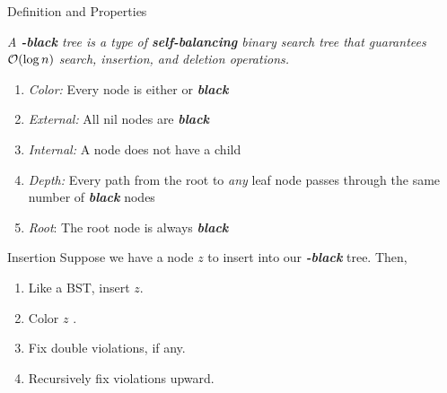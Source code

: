 \documentclass[aspectratio=169]{beamer}
\newcommand{\textib}[1]{\textit{\textbf{{#1}}}}
\newcommand{\red}{\textib{\color{red}{red }}}
\newcommand{\define}[1]{\begin{tcolorbox}[title={Definition}]\small{\textit{{#1}}}\end{tcolorbox}}
\begin{document}
\begin{frame}[fragile]{Definition and Properties}
    \define{
        A \textib{\color{red}{red}}\textib{-black} tree is a type of \textib{self-balancing} binary 
        search tree that guarantees ${\cal{O}}(\log n)$ search, insertion, and deletion operations.
    }
    \begin{enumerate}[label=\textit{(\roman*)}]
        \item \textit{Color:} Every node is either \red or \textib{black}
        \item \textit{External:} All nil nodes are \textib{black}
        \item \textit{Internal:} A \red node does not have a \red child
        \item \textit{Depth:} Every path from the root to \textit{any} leaf node passes through
            the same number of \textib{black} nodes
        \item \textit{Root}: The root node is always \textib{black}
    \end{enumerate}
\end{frame}


\begin{frame}{Insertion}
    Suppose we have a node $z$ to insert into our \textib{\color{red}{red}}\textib{-black} tree. Then,
    \begin{enumerate}[label=\textit{(\roman*)}]
        \item<2-> Like a BST, insert $z$.
        \item<3-> Color $z$ \textib{\color{red}{red}}.
        \item<4-> Fix double \red violations, if any.
        \item<5-> Recursively fix violations upward.
    \end{enumerate}
\end{frame}
\end{document}
